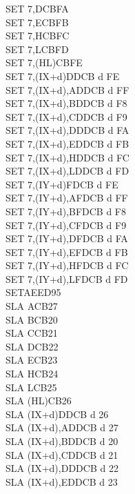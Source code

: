 \begin{multicols}{3}
{\begin{tabbing}
        SET 7,D\>CBFA\\
        SET 7,E\>CBFB\\
        SET 7,H\>CBFC\\
        SET 7,L\>CBFD\\
        SET 7,(HL)\>CBFE\\
        SET 7,(IX+d)\>DDCB d FE\\
        SET 7,(IX+d),A\UNDOC\>DDCB d FF\\
        SET 7,(IX+d),B\UNDOC\>DDCB d F8\\
        SET 7,(IX+d),C\UNDOC\>DDCB d F9\\
        SET 7,(IX+d),D\UNDOC\>DDCB d FA\\
        SET 7,(IX+d),E\UNDOC\>DDCB d FB\\
        SET 7,(IX+d),H\UNDOC\>DDCB d FC\\
        SET 7,(IX+d),L\UNDOC\>DDCB d FD\\
        SET 7,(IY+d)\>FDCB d FE\\
        SET 7,(IY+d),A\UNDOC\>FDCB d FF\\
        SET 7,(IY+d),B\UNDOC\>FDCB d F8\\
        SET 7,(IY+d),C\UNDOC\>FDCB d F9\\
        SET 7,(IY+d),D\UNDOC\>FDCB d FA\\
        SET 7,(IY+d),E\UNDOC\>FDCB d FB\\
        SET 7,(IY+d),H\UNDOC\>FDCB d FC\\
        SET 7,(IY+d),L\UNDOC\>FDCB d FD\\
        SETAE\ZXN\>ED95\\
        SLA A\>CB27\\
        SLA B\>CB20\\
        SLA C\>CB21\\
        SLA D\>CB22\\
        SLA E\>CB23\\
        SLA H\>CB24\\
        SLA L\>CB25\\
        SLA (HL)\>CB26\\
        SLA (IX+d)\>DDCB d 26\\
        SLA (IX+d),A\UNDOC\>DDCB d 27\\
        SLA (IX+d),B\UNDOC\>DDCB d 20\\
        SLA (IX+d),C\UNDOC\>DDCB d 21\\
        SLA (IX+d),D\UNDOC\>DDCB d 22\\
        SLA (IX+d),E\UNDOC\>DDCB d 23\\

\end{tabbing}}
\end{multicols}
